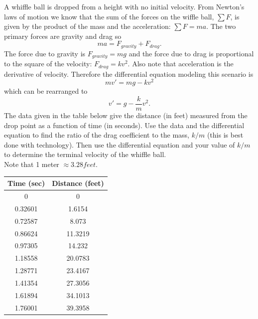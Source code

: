 \begin{problem}
    A whiffle ball is dropped from a height with no initial velocity.  From Newton's laws
    of motion we know that the sum of the forces on the wiffle ball, $\sum F$, is given by the product of
    the mass and the acceleration: $\sum F= ma$.  The two primary forces are gravity and
    drag so 
    \[ m a = F_{gravity} + F_{drag}. \]
    The force due to gravity is $F_{gravity} = mg$ and the force due to drag is
    proportional to the square of the velocity: $F_{drag} = k v^2$.  Also note that
    acceleration is the derivative of velocity.  Therefore the differential equation
    modeling this scenario is
    \[ m v' = mg - kv^2 \]
    which can be rearranged to 
    \[ v' = g - \frac{k}{m} v^2. \]
    The data given in the table below give the distance (in feet) measured from the drop
    point as a function of time (in seconds).  Use the data and the differential equation
    to find the ratio of the drag coefficient to the mass, $k/m$ (this is best done with
    technology). Then use the
    differential equation and your value of $k/m$ to determine the terminal velocity of
    the whiffle ball. \\
    Note that 1 meter $\approx 3.28 feet$.
    \begin{center}
        \begin{tabular}{|c|c|}
            \hline
            Time (sec) & Distance (feet) \\ \hline \hline
0  & 0\\
0.32601&1.6154\\
0.72587&8.073\\
0.86624&11.3219\\
0.97305&14.232\\
1.18558&20.0783\\
1.28771&23.4167\\
1.41354&27.3056\\
1.61894&34.1013\\
1.76001&39.3958\\ \hline
        \end{tabular}
    \end{center}
\end{problem}

